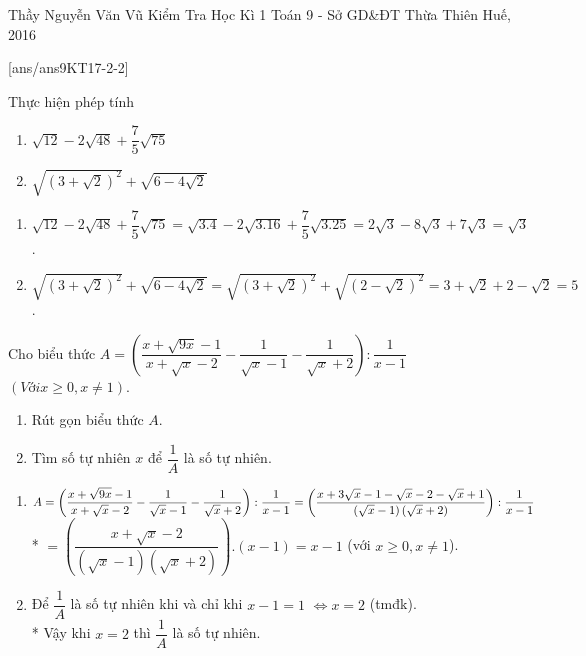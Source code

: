 \begin{name}
{Thầy  Nguyễn Văn Vũ}
{Kiểm Tra Học Kì 1 Toán 9 - Sở GD\&ĐT Thừa Thiên Huế, 2016}
\end{name}
\setcounter{ex}{0}
[ans/ans9KT17-2-2]

\begin{ex}
	Thực hiện phép tính
 \hfill
    \begin{enumerate}
        \item $\sqrt{12}-2\sqrt{48}+\dfrac{7}{5}\sqrt{75}$
        \item $\sqrt{\left(3+\sqrt{2}\right)^{2}}+\sqrt{6-4\sqrt{2}}$
    \end{enumerate}
\loigiai
    {
    \begin{enumerate}
        \item $\sqrt{12}-2\sqrt{48}+\dfrac{7}{5}\sqrt{75}=\sqrt{3.4}-2\sqrt{3.16}+\dfrac{7}{5}\sqrt{3.25}=2\sqrt{3}-8\sqrt{3}+7\sqrt{3}=\sqrt{3}$.
        \item $\sqrt{\left(3+\sqrt{2}\right)^{2}}+\sqrt{6-4\sqrt{2}}=\sqrt{\left(3+\sqrt{2}\right)^{2}}+\sqrt{\left(2-\sqrt{2}\right)^{2}}=3+\sqrt{2}+2-\sqrt{2}=5$.
    \end{enumerate}
    }
\end{ex}

\begin{ex}
Cho biểu thức $A=\left(\dfrac{x+\sqrt{9x}-1}{x+\sqrt{x}-2}-\dfrac{1}{\sqrt{x}-1}-\dfrac{1}{\sqrt{x}+2}\right):\dfrac{1}{x-1}$   $(Với x\geq 0,x\neq 1)$.
\hfill
\begin{enumerate}
\item Rút gọn biểu thức $A$.
\item Tìm số tự nhiên $x$ để $\dfrac{1}{A}$ là số tự nhiên.
\end{enumerate}
\loigiai
 {
 \begin{enumerate}
        \item $A=\left(\dfrac{x+\sqrt{9x}-1}{x+\sqrt{x}-2}-\dfrac{1}{\sqrt{x}-1}-\dfrac{1}{\sqrt{x}+2}\right):\dfrac{1}{x-1} \\*
        =\left(\dfrac{x+3\sqrt{x}-1-\sqrt{x}-2-\sqrt{x}+1}{\left(\sqrt{x}-1\right)\left(\sqrt{x}+2\right)}\right):\dfrac{1}{x-1}$
        \\*
        $=\left( \dfrac{x+\sqrt{x}-2}{\left(\sqrt{x}-1\right)\left(\sqrt{x}+2\right)}\right).\left( x-1\right)=x-1$ (với $x\geq 0,x\neq 1$).
        \item Để $\dfrac{1}{A}$ là số tự nhiên khi và chỉ khi $x-1=1$ $\Leftrightarrow x=2$ (tmđk).\\*
        Vậy khi $x=2$ thì $\dfrac{1}{A}$ là số tự nhiên.
  \end{enumerate}
 }
\end{ex}

